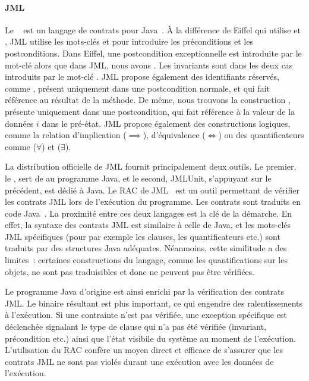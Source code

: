 \paragraph{JML} Le ~ est un langage
de contrats pour Java~. À la différence de Eiffel qui utilise
 et , JML utilise les mots-clés  et
 pour introduire les préconditions et les postconditions. Dans
Eiffel, une postcondition exceptionnelle est introduite par le mot-clé
 alors que dans JML, nous avons . Les invariants sont
dans les deux cas introduits par le mot-clé . JML propose
également des identifiants réservés, comme \aresult, présent uniquement dans une
postcondition normale, et qui fait référence au résultat de la méthode.  De
même, nous trouvons la construction , présente uniquement dans une
postcondition, qui fait référence à la valeur de la données $i$ dans le
pré-état. JML propose également des constructions logiques, comme la relation
d'implication ($\implies$), d'équivalence ($\Longleftrightarrow$) ou des
quantificateurs comme  ($\forall$) et
 ($\exists$).

La distribution officielle de JML fournit principalement deux outils.  Le
premier, le , sert de
 au programme Java, et le second, JMLUnit, s'appuyant sur
le précédent, est dédié à Java. Le RAC de JML~ est un outil
permettant de vérifier les contrats JML lors de l'exécution du programme. Les
contrats sont traduits en code Java~. La proximité entre ces
deux langages est la clé de la démarche. En effet, la syntaxe des contrats JML
est similaire à celle de Java, et les mots-clés JML spécifiques (pour par
exemple les clauses, les quantificateurs etc.) sont traduits par des structures
Java adéquates. Néanmoins, cette similitude a des limites~: certaines
constructions du langage, comme les quantifications sur les objets, ne sont pas
traduisibles et donc ne peuvent pas être vérifiées.

Le programme Java d'origine est ainsi enrichi par la vérification des contrats
JML. Le binaire résultant est plus important, ce qui engendre des
ralentissements à l'exécution. Si une contrainte n'est pas vérifiée, une
exception spécifique est déclenchée signalant le type de clause qui n'a pas été
vérifiée (invariant, précondition etc.) ainsi que l'état visibile du système au
moment de l'exécution.  L'utilisation du RAC confère un moyen direct et efficace
de s'assurer que les contrats JML ne sont pas violés durant une exécution avec
les données de l'exécution.

